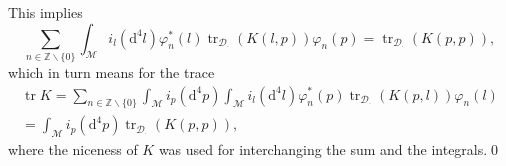 \documentclass[oneside,reqno,12pt]{amsart}
\DeclareMathOperator{\tr}{tr}
\begin{document}
This implies
\begin{equation*}
 \sum_{n\in\mathbb{Z}\backslash\{0\}}   \int_{\mathcal{M}}i_l \left(\mathrm{d}^4 l\right) \varphi_n^*(l)  \tr_{\mathcal{D}_{\cdot}}(K(l,p)) \varphi_n (p)= \tr_{\mathcal{D}_{\cdot}}(K(p,p)),
\end{equation*}
which in turn means for the trace
\begin{align*}
\tr K =  \sum_{n\in\mathbb{Z}\backslash\{0\}} \int_{\mathcal{M}}i_p \left(\mathrm{d}^4 p\right) \int_{\mathcal{M}}i_l \left(\mathrm{d}^4 l\right) \varphi_n^*(p) \tr_{\mathcal{D}_{\cdot}}(K(p,l)) \varphi_n (l)\\
= \int_{\mathcal{M}}i_p \left(\mathrm{d}^4 p\right) \tr_{\mathcal{D}_{\cdot}}(K(p,p))
,\end{align*} 
 where the niceness of \(K\) was used for interchanging the sum and the integrals.\qed
 

 
\end{document}
